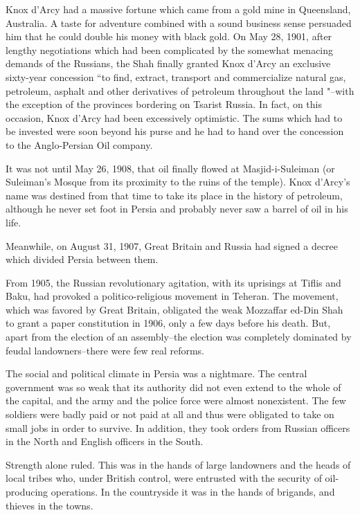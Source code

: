 Knox d'Arcy had a massive fortune which came from a gold mine in Queensland, Australia. A taste for adventure combined with a sound business sense persuaded him that he could double his money with black gold. On May 28, 1901, after lengthy negotiations which had been complicated by the somewhat menacing demands of the Russians, the Shah finally granted Knox d'Arcy an exclusive sixty-year concession “to find, extract, transport and commercialize natural gas, petroleum, asphalt and other derivatives of petroleum throughout the land "--with the exception of the provinces bordering on Tsarist Russia. In fact, on this occasion, Knox d'Arcy had been excessively optimistic. The sums which had to be invested were soon beyond his purse and he had to hand over the concession to the Anglo-Persian Oil company. 

It was not until May 26, 1908, that oil finally flowed at Masjid-i-Suleiman (or Suleiman’s Mosque from its proximity to the ruins of the temple). Knox d'Arcy’s name was destined from that time to take its place in the history of petroleum, although he never set foot in Persia and probably never saw a barrel of oil in his life. 

Meanwhile, on August 31, 1907, Great Britain and Russia had signed a decree which divided Persia between them. 


From 1905, the Russian revolutionary agitation, with its uprisings at Tiflis and Baku, had provoked a politico-religious movement in Teheran. The movement, which was favored by Great Britain, obligated the weak Mozzaffar ed-Din Shah to grant a paper constitution in 1906, only a few days before his death. But, apart from the election of an assembly--the election was completely dominated by feudal landowners--there were few real reforms. 

The social and political climate in Persia was a nightmare. The central government was so weak that its authority did not even extend to the whole of the capital, and the army and the police force were almost nonexistent. The few soldiers were badly paid or not paid at all and thus were obligated to take on small jobs in order to survive. In addition, they took orders from Russian officers in the North and English officers in the South. 

Strength alone ruled. This was in the hands of large landowners and the heads of local tribes who, under British control, were entrusted with the security of oil-producing operations. In the countryside it was in the hands of brigands, and thieves in the towns. 

